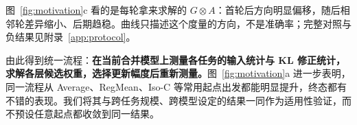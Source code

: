 图~\ref{fig:motivation}c 看的是每轮拿来求解的 $G\otimes A$：首轮后方向明显偏移，随后相邻轮差异缩小、后期趋稳。曲线只描述这个度量的方向，不是准确率；完整对照与负结果见附录~\ref{app:protocol}。

由此得到统一流程：\textbf{在当前合并模型上测量各任务的输入统计与 KL 修正统计，求解各层候选权重，选择更新幅度后重新测量。}图~\ref{fig:motivation}a 进一步表明，同一流程从 Average、RegMean、Iso-C 等常用起点出发都能明显提升，终态都有不错的表现。我们将其与跨任务规模、跨模型设定的结果一同作为适用性验证，而不预设任意起点都收敛到同一结果。
